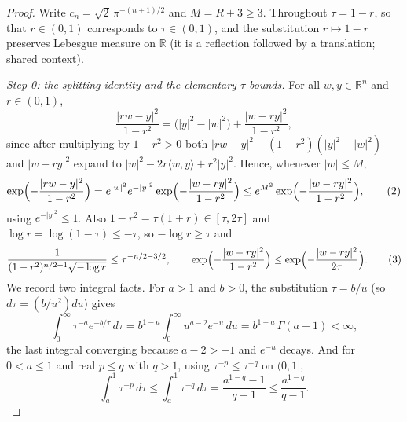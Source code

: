\begin{proof}
Write $c_n = \sqrt2\,\pi^{-(n+1)/2}$ and $M = R+3 \geq 3$.  Throughout
$\tau = 1 - r$, so that $r \in (0,1)$ corresponds to $\tau \in (0,1)$, and the
substitution $r \mapsto 1-r$ preserves Lebesgue measure on $\mathbb{R}$ (it is
a reflection followed by a translation; shared context).

\emph{Step 0: the splitting identity and the elementary $\tau$-bounds.}
For all $w,y \in \mathbb{R}^n$ and $r \in (0,1)$,
\begin{equation*}
  \frac{|rw-y|^2}{1-r^2} = \bigl(|y|^2-|w|^2\bigr) + \frac{|w-ry|^2}{1-r^2} ,
  \tag{1}
\end{equation*}
since after multiplying by $1-r^2 > 0$ both
$|rw-y|^2 - (1-r^2)(|y|^2-|w|^2)$ and $|w-ry|^2$ expand to
$|w|^2 - 2r\langle w,y\rangle + r^2|y|^2$.  Hence, whenever $|w| \leq M$,
\begin{equation*}
  \exp\Bigl(-\frac{|rw-y|^2}{1-r^2}\Bigr)
    = e^{|w|^2}e^{-|y|^2}\exp\Bigl(-\frac{|w-ry|^2}{1-r^2}\Bigr)
    \leq e^{M^2}\exp\Bigl(-\frac{|w-ry|^2}{1-r^2}\Bigr) , \tag{2}
\end{equation*}
using $e^{-|y|^2} \leq 1$.  Also $1-r^2 = \tau(1+r) \in [\tau,2\tau]$ and
$\log r = \log(1-\tau) \leq -\tau$, so $-\log r \geq \tau$ and
\begin{equation*}
  \frac{1}{(1-r^2)^{n/2+1}\sqrt{-\log r}} \leq \tau^{-n/2-3/2} ,
  \qquad
  \exp\Bigl(-\frac{|w-ry|^2}{1-r^2}\Bigr)
    \leq \exp\Bigl(-\frac{|w-ry|^2}{2\tau}\Bigr) . \tag{3}
\end{equation*}
We record two integral facts.  For $a > 1$ and $b > 0$, the substitution
$\tau = b/u$ (so $d\tau = (b/u^2)du$) gives
\begin{equation*}
  \int_0^\infty \tau^{-a}e^{-b/\tau}\,d\tau
    = b^{1-a}\int_0^\infty u^{a-2}e^{-u}\,du
    = b^{1-a}\,\Gamma(a-1) < \infty , \tag{4}
\end{equation*}
the last integral converging because $a-2 > -1$ and $e^{-u}$ decays.  And for
$0 < a \leq 1$ and real $p \leq q$ with $q > 1$, using $\tau^{-p} \leq
\tau^{-q}$ on $(0,1]$,
\begin{equation*}
  \int_a^1\tau^{-p}\,d\tau \leq \int_a^1\tau^{-q}\,d\tau
    = \frac{a^{1-q}-1}{q-1} \leq \frac{a^{1-q}}{q-1} . \tag{5}
\end{equation*}


\end{proof}
